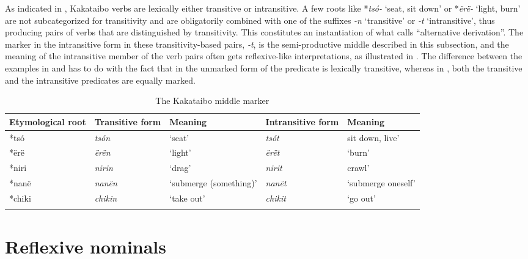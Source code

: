 \documentclass[output=paper,colorlinks,citecolor=brown,modfonts,nonflat]{langscibook}
\begin{document}
As indicated in , Kakataibo verbs are lexically either transitive or intransitive. A few roots like *\textit{tsó-} ‘seat, sit down’ or *\textit{ërë-} ‘light, burn’ are not subcategorized for transitivity and are obligatorily combined with one of the suffixes \textit{{}-n} ‘transitive’ or \textit{{}-t} ‘intransitive’, thus producing pairs of verbs that are distinguished by transitivity. This constitutes an instantiation of what \citet[416ss]{Valenzuela2017} calls “alternative derivation”. The marker in the intransitive form in these transitivity-based pairs, \textit{{}-t}, is the semi-productive middle described in this subsection, and the meaning of the intransitive member of the verb pairs often gets reflexive-like interpretations, as illustrated in . The difference between the examples in  and  has to do with the fact that in  the unmarked form of the predicate is lexically transitive, whereas in , both the transitive and the intransitive predicates are equally marked.

\begin{table}
    \caption{The Kakataibo middle marker}
    \label{tab:zariquiey:4}
    \begin{tabularx}{\textwidth}{XXXXX}
        \lsptoprule
        Etymological root & Transitive form & Meaning & Intransitive form & Meaning\\
        \midrule
        *tsó & \textit{tsón} & ‘seat’ & \textit{tsót}  & sit down, live’\\
        *ërë & \textit{ërën} & ‘light’ & \textit{ërët} & ‘burn’\\
        *niri & \textit{nirin} & ‘drag’ & \textit{nirit} & crawl’\\
        *nanë & \textit{nanën} & ‘submerge (something)’ & \textit{nanët} & ‘submerge oneself’\\
        *chiki & \textit{chikin} & ‘take out’ & \textit{chikit} & ‘go out’\\
        \lspbottomrule
    \end{tabularx}
\end{table}

\section{Reflexive nominals}\label{sec:zariquiey:4}
\end{document}
